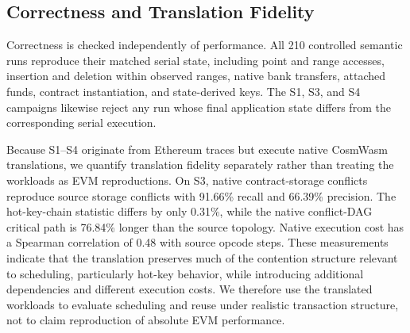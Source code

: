 \subsection{Correctness and Translation Fidelity}
\label{sec:eval-correctness}

Correctness is checked independently of performance. All 210 controlled semantic runs reproduce their matched serial state, including point and range accesses, insertion and deletion within observed ranges, native bank transfers, attached funds, contract instantiation, and state-derived keys. The S1, S3, and S4 campaigns likewise reject any run whose final application state differs from the corresponding serial execution.

Because S1--S4 originate from Ethereum traces but execute native CosmWasm translations, we quantify translation fidelity separately rather than treating the workloads as EVM reproductions. On S3, native contract-storage conflicts reproduce source storage conflicts with 91.66\% recall and 66.39\% precision. The hot-key-chain statistic differs by only 0.31\%, while the native conflict-DAG critical path is 76.84\% longer than the source topology. Native execution cost has a Spearman correlation of 0.48 with source opcode steps. These measurements indicate that the translation preserves much of the contention structure relevant to scheduling, particularly hot-key behavior, while introducing additional dependencies and different execution costs. We therefore use the translated workloads to evaluate scheduling and reuse under realistic transaction structure, not to claim reproduction of absolute EVM performance.
